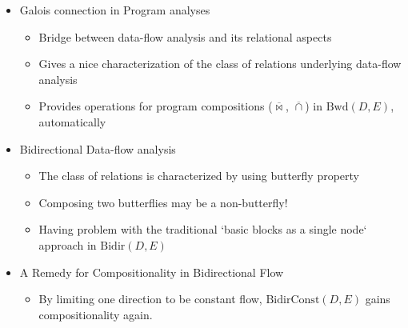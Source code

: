 \documentclass{llncs}
\newcommand{\Bidir}{\mathrm{Bidir}}
\newcommand{\Unidir}{\mathrm{Bwd}}
\newcommand{\UnidirConst}{\mathrm{BidirConst}}
\newcommand{\bowtielift}{\mathbin{\overline{\bowtie}}}
\newcommand{\caplift}{\mathbin{\overline{\cap}}}
\begin{document}
\begin{itemize}
    \item Galois connection in Program analyses
    \begin{itemize}
      \item Bridge between data-flow analysis and its relational aspects
      \item Gives a nice characterization of the class of relations underlying data-flow analysis
      \item Provides operations for program compositions ($\bowtielift$, $\caplift$) in $\Unidir(D, E)$, automatically
    \end{itemize}
    \item Bidirectional Data-flow analysis
    \begin{itemize}
      \item The class of relations is characterized by using butterfly property
      \item Composing two butterflies may be a non-butterfly!
      \item Having problem with the traditional `basic blocks as a single node` approach in $\Bidir(D, E)$
    \end{itemize}
    \item A Remedy for Compositionality in Bidirectional Flow
    \begin{itemize}
      \item By limiting one direction to be constant flow, $\UnidirConst(D, E)$ gains compositionality again.
    \end{itemize}
  \end{itemize}



\nocite{*}  %
  

  
\end{document}
